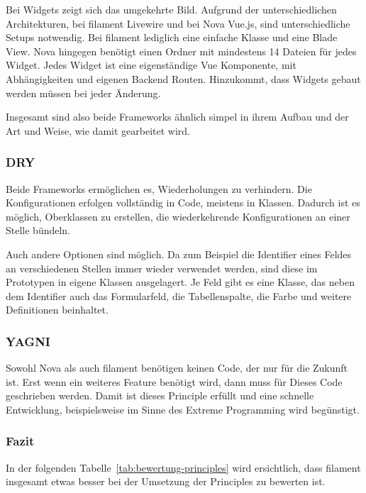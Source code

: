 Bei Widgets zeigt sich das umgekehrte Bild.
Aufgrund der unterschiedlichen Architekturen, bei filament Livewire und bei Nova Vue.js, sind unterschiedliche Setups notwendig.
Bei filament lediglich eine einfache Klasse und eine Blade View.
Nova hingegen benötigt einen Ordner mit mindestens 14 Dateien für jedes Widget.
Jedes Widget ist eine eigenständige Vue Komponente, mit Abhängigkeiten und eigenen Backend Routen.
Hinzukommt, dass Widgets gebaut werden müssen bei jeder Änderung.

Insgesamt sind also beide Frameworks ähnlich simpel in ihrem Aufbau und der Art und Weise, wie damit gearbeitet wird.

\subsubsection{DRY}
Beide Frameworks ermöglichen es, Wiederholungen zu verhindern.
Die Konfigurationen erfolgen vollständig in Code, meistens in Klassen.
Dadurch ist es möglich, Oberklassen zu erstellen, die wiederkehrende Konfigurationen an einer Stelle bündeln.

Auch andere Optionen sind möglich.
Da zum Beispiel die Identifier eines Feldes an verschiedenen Stellen immer wieder verwendet werden, sind diese im Prototypen in eigene Klassen ausgelagert.
Je Feld gibt es eine Klasse, das neben dem Identifier auch das Formularfeld, die Tabellenspalte, die Farbe und weitere Definitionen beinhaltet.

\subsubsection{YAGNI}
Sowohl Nova als auch filament benötigen keinen Code, der nur für die Zukunft ist.
Erst wenn ein weiteres Feature benötigt wird, dann muss für Dieses Code geschrieben werden.
Damit ist dieses Principle erfüllt und eine schnelle Entwicklung, beispielsweise im Sinne des Extreme Programming wird begünstigt.

\subsubsection{Fazit}
In der folgenden Tabelle~\ref{tab:bewertung-principles} wird ersichtlich, dass filament insgesamt etwas besser bei der Umsetzung der Principles zu bewerten ist.

